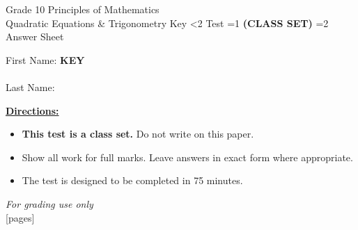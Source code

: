 \documentclass[addpoints]{exam}
\newcommand{\event}{Quadratic Equations \& Trigonometry}
\newcommand{\tournament}{}
\def\type{0}
\begin{document}
\begin{center}
    {\huge Grade 10 Principles of Mathematics \\ \event
    \ifprintanswers \space Key
    \else \space \ifnum\type<2 Test \fi \ifnum\type=1 \textbf{(CLASS SET)} \fi
          \ifnum\type=2 Answer Sheet \fi
    \fi \\ \vspace{3mm}\tournament\vspace{1mm}}
\end{center}

\vspace{.25\textheight}

\begin{center}
    First Name: \ifprintanswers
    \underline{\hspace{3.5cm}}\textbf{KEY}\underline{\hspace{5.5cm}}\\\ \vspace{5mm}
    \else \underline{\hspace{10cm}}\\ \vspace{5mm} \fi
    Last Name: \underline{\hspace{10cm}}\\ \vspace{5mm}
\end{center}

\noindent\textbf{\underline{Directions:}}
\begin{itemize}
    \ifnum\type=1 \item \textbf{This test is a class set.} Do not write on this paper. \fi
    \item Show all work for full marks. Leave answers in exact form where appropriate.
    \item The test is designed to be completed in 75 minutes.
\end{itemize}
\begin{center}
\textit{For grading use only}\\
[pages]
\end{center}
\end{document}

